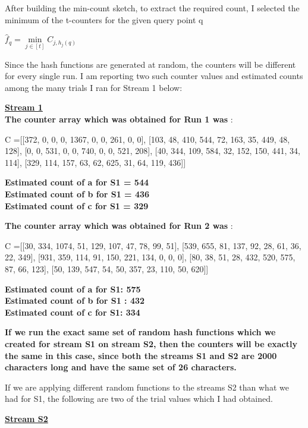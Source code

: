 \documentclass[11pt]{article}
\begin{document}
\begin{itemize}
After building the min-count sketch, to extract the required count, I selected the minimum of the t-counters for the given query point q
\begin{center}
$\hat f_q = \underset{j \in [t] }{\min }  C_{j,h_j(q)}$
\end{center}
Since the hash functions are generated at random, the counters will be different for every single run. I am reporting two such counter values and estimated counts among the many trials I ran for Stream 1 below:

\textbf{\underline{Stream 1}}\\

\textbf{The counter array which was obtained for Run 1 was} :

C =[[372, 0, 0, 0, 1367, 0, 0, 261, 0, 0], [103, 48, 410, 544, 72, 163, 35, 449, 48, 128], [0, 0, 531, 0, 0, 740, 0, 0, 521, 208], [40, 344, 109, 584, 32, 152, 150, 441, 34, 114], [329, 114, 157, 63, 62, 625, 31, 64, 119, 436]]

\textbf{Estimated count of a for S1 = 544\\
Estimated count of b for S1 = 436\\
Estimated count of c for S1 = 329\\}

\pagebreak

\textbf{The counter array which was obtained for Run 2 was} :

C =[[30, 334, 1074, 51, 129, 107, 47, 78, 99, 51], [539, 655, 81, 137, 92, 28, 61, 36, 22, 349], [931, 359, 114, 91, 150, 221, 134, 0, 0, 0], [80, 38, 51, 28, 432, 520, 575, 87, 66, 123], [50, 139, 547, 54, 50, 357, 23, 110, 50, 620]]


\textbf{Estimated count of a for S1: 575\\
	Estimated count of b for S1 : 432\\
	Estimated count of c for S1: 334\\}
		
		
		
\textbf{If we run the exact same set of random hash functions which we created for stream S1 on stream S2, then the counters will be exactly the same in this case, since both the streams S1 and S2 are 2000 characters long and have the same set of 26 characters.	}

If we are applying different random functions to the streams S2 than what we had for S1, the following are two of the trial values which I had obtained.

\textbf{\underline{Stream S2}} \\



\end{itemize}
\end{document}
